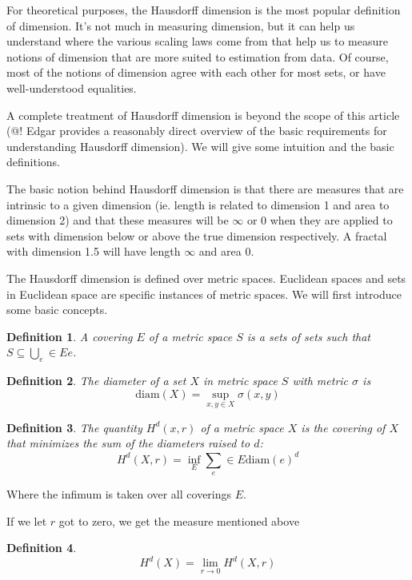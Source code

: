 \documentclass[11pt]{article}
\newtheorem{dfn}{Definition}
\begin{document}
For theoretical purposes, the Hausdorff dimension is the most popular definition of dimension. It's not much in measuring dimension, but it can help us understand where the various scaling laws come from that help us to measure notions of dimension that are more suited to estimation from data. Of course, most of the notions of dimension agree with each other for most sets, or have well-understood equalities.

A complete treatment of Hausdorff dimension is beyond the scope of this article (@! Edgar provides a reasonably direct overview of the basic requirements for understanding Hausdorff dimension). We will give some intuition and the basic definitions. 

The basic notion behind Hausdorff dimension is that there are measures that are intrinsic to a given dimension (ie. length is related to dimension 1 and area to dimension 2) and that these measures will be $\infty$ or $0$ when they are applied to sets with dimension below or above the true dimension respectively. A fractal with dimension 1.5 will have length $\infty$ and area $0$.

The Hausdorff dimension is defined over metric spaces. Euclidean spaces and sets in Euclidean space are specific instances of metric spaces. We will first introduce some basic concepts.

\begin{dfn}
A covering $E$ of a metric space $S$ is a sets of sets such that $S \subseteq\bigcup_e \in E e$. 
\end{dfn}

\begin{dfn}
The diameter of a set $X$ in metric space $S$ with metric $\sigma$ is
\[
\mbox{diam}(X) = \sup_{x, y \in X}\sigma(x, y)
\]
\end{dfn}

\begin{dfn}
The quantity $H^d(x, r)$ of a metric space $X$ is the covering of $X$ that minimizes the sum of the diameters raised to $d$:
\[
H^d(X, r) = \inf_E \sum_e \in E \mbox{diam}(e)^d
\]  
\end{dfn}

Where the infimum is taken over all coverings $E$.

If we let $r$ got to zero, we get the measure mentioned above

\begin{dfn}
\[
H^d(X) = \lim_{r \rightarrow 0} H^d(X, r)
\] 
\end{dfn}
\end{document}
